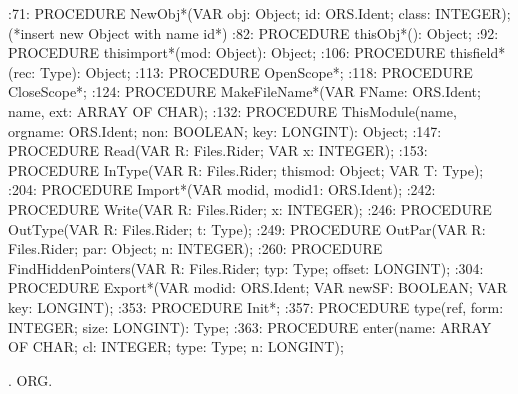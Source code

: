 :71:  PROCEDURE NewObj*(VAR obj: Object; id: ORS.Ident; class: INTEGER);  (*insert new Object with name id*)
:82:  PROCEDURE thisObj*(): Object;
:92:  PROCEDURE thisimport*(mod: Object): Object;
:106:  PROCEDURE thisfield*(rec: Type): Object;
:113:  PROCEDURE OpenScope*;
:118:  PROCEDURE CloseScope*;
:124:  PROCEDURE MakeFileName*(VAR FName: ORS.Ident; name, ext: ARRAY OF CHAR);
:132:  PROCEDURE ThisModule(name, orgname: ORS.Ident; non: BOOLEAN; key: LONGINT): Object;
:147:  PROCEDURE Read(VAR R: Files.Rider; VAR x: INTEGER);
:153:  PROCEDURE InType(VAR R: Files.Rider; thismod: Object; VAR T: Type);
:204:  PROCEDURE Import*(VAR modid, modid1: ORS.Ident);
:242:  PROCEDURE Write(VAR R: Files.Rider; x: INTEGER);
:246:  PROCEDURE OutType(VAR R: Files.Rider; t: Type);
:249:    PROCEDURE OutPar(VAR R: Files.Rider; par: Object; n: INTEGER);
:260:    PROCEDURE FindHiddenPointers(VAR R: Files.Rider; typ: Type; offset: LONGINT);
:304:  PROCEDURE Export*(VAR modid: ORS.Ident; VAR newSF: BOOLEAN; VAR key: LONGINT);
:353:  PROCEDURE Init*;
:357:  PROCEDURE type(ref, form: INTEGER; size: LONGINT): Type;
:363:  PROCEDURE enter(name: ARRAY OF CHAR; cl: INTEGER; type: Type; n: LONGINT);

. ORG.

